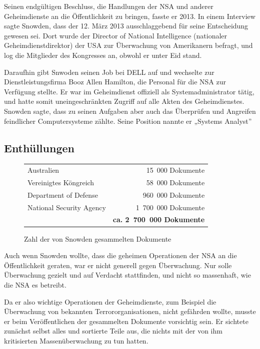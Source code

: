 \documentclass[12pt,a4paper]{scrartcl}
\begin{document}
Seinen endgültigen Beschluss, die Handlungen der NSA und anderer Geheimdienste an die Öffentlichkeit zu bringen, fasste er 2013. In einem Interview sagte Snowden, dass der 12. März 2013 ausschlaggebend für seine Entscheidung gewesen sei. Dort wurde der Director of National Intelligence (nationaler Geheimdienstdirektor) der USA zur Überwachung von Amerikanern befragt, und log die Mitglieder des Kongresses an, obwohl er unter Eid stand.\cite{wiki_snowden}\cite{citizenfour}

Daraufhin gibt Snwoden seinen Job bei DELL auf und wechselte zur Dienstleistungsfirma Booz Allen Hamilton, die Personal für die NSA zur Verfügung stellte. Er war im Geheimdienst offiziell als Systemadministrator tätig, und hatte somit uneingeschränkten Zugriff auf alle Akten des Geheimdienstes. Snowden sagte, dass zu seinen Aufgaben aber auch das Überprüfen und Angreifen feindlicher Computersysteme zählte. Seine Position nannte er „Systems Analyst”\cite{citizenfour}

\subsection{Enthüllungen}

\begin{figure}[H]
\centering
\begin{tabular}{lr}
Australien & 15~000 Dokumente \\
Vereinigtes Köngreich & 58~000 Dokumente \\
Department of Defense & 960~000 Dokumente \\
National Security Agency & 1~700~000 Dokumente \\
& \textbf{ca. 2~700~000 Dokumente}
\end{tabular}
\caption{Zahl der von Snowden gesammelten Dokumente \cite{wiki_snowden}}
\end{figure}

Auch wenn Snowden wollte, dass die geheimen Operationen der NSA an die Öffentlichkeit geraten, war er nicht generell gegen Überwachung. Nur solle Überwachung gezielt und auf Verdacht stattfinden, und nicht so massenhaft, wie die NSA es betreibt.\cite{wiki_snowden}\cite{citizenfour}

Da er also wichtige Operationen der Geheimdienste, zum Beispiel die Überwachung von bekannten Terrororganisationen, nicht gefährden wollte, musste er beim Veröffentlichen der gesammelten Dokumente vorsichtig sein. Er sichtete zunächst selbst alles und sortierte Teile aus, die nichts mit der von ihm kritisierten Massenüberwachung zu tun hatten.\cite{wiki_snowden}\cite{citizenfour}
\end{document}
